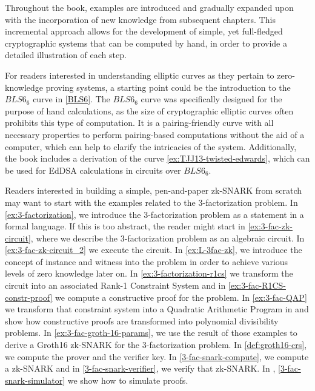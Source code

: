 Throughout the book, examples are introduced and gradually expanded upon with the incorporation of new knowledge from subsequent chapters. This incremental approach allows for the development of simple, yet full-fledged cryptographic systems that can be computed by hand, in order to provide a detailed illustration of each step.

For readers interested in understanding elliptic curves as they pertain to zero-knowledge proving systems, a starting point could be the introduction to the $BLS6_6$ curve in \secname{} \ref{BLS6}. The $BLS6_6$ curve was specifically designed for the purpose of hand calculations, as the size of cryptographic elliptic curves often prohibits this type of computation. It is a pairing-friendly curve with all necessary properties to perform pairing-based computations without the aid of a computer, which can help to clarify the intricacies of the system. Additionally, the book includes a derivation of the  curve \ref{ex:TJJ13-twisted-edwards}, which can be used for EdDSA calculations in circuits over $BLS6_6$.

Readers interested in building a simple, pen-and-paper zk-SNARK from scratch may want to start with the examples related to the 3-factorization problem. In \examplename{} \ref{ex:3-factorization}, we introduce the 3-factorization problem as a statement in a formal language. If this is too abstract, the reader might start in \examplename{} \ref{ex:3-fac-zk-circuit}, where we describe the 3-factorization problem as an algebraic circuit. In \examplename{} \ref{ex:3-fac-zk-circuit_2} we execute the circuit. In \examplename{} \ref{ex:L-3fac-zk}, we introduce the concept of instance and witness into the problem in order to achieve various levels of zero knowledge later on. In \examplename{} \ref{ex:3-factorization-r1cs} we transform the circuit into an associated Rank-1 Constraint System and in \examplename{} \ref{ex:3-fac-R1CS-constr-proof} we compute a constructive proof for the problem. In \examplename{} \ref{ex:3-fac-QAP} we transform that constraint system into a Quadratic Arithmetic Program in and show how constructive proofs are transformed into polynomial divisibility problems. In \examplename{} \ref{ex:3-fac-groth-16-params}, we  use the result of those examples to derive a Groth16 zk-SNARK for the 3-factorization problem. In \ref{def:groth16-crs}, we compute the prover and the verifier key. In \examplename{} \ref{3-fac-snark-compute}, we compute a zk-SNARK and in \examplename{} \ref{3-fac-snark-verifier}, we verify that zk-SNARK. In \examplename{}, \ref{3-fac-snark-simulator} we show how to simulate proofs. 

